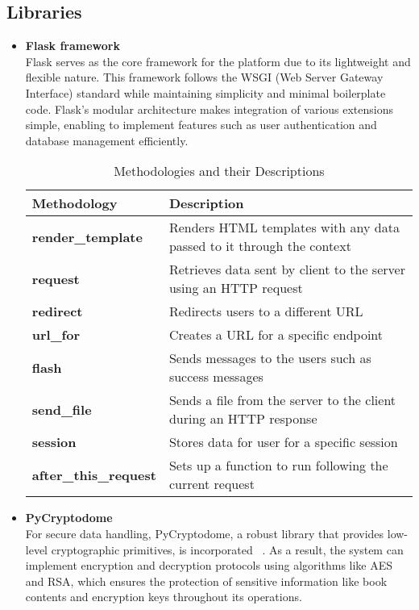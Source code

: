 \documentclass[12pt]{article}
\begin{document}
\subsection{Libraries}
\begin{itemize}
	\item \textbf{Flask framework } \\
	Flask serves as the core framework for the platform due to its lightweight and flexible nature. This framework follows the WSGI (Web Server Gateway Interface) standard while maintaining simplicity and minimal boilerplate code. Flask’s modular architecture makes integration of various extensions simple, enabling to implement features such as user authentication and database management efficiently.
	\begin{table}[htbp]
		\centering
		\begin{tabular}{|>{\bfseries}m{5cm}|m{7cm}|}  %
			\hline
			\textbf{Methodology} & \textbf{Description} \\
			\hline
			render\_template & Renders HTML templates with any data passed to it through the context \\
			\hline
			request          & Retrieves data sent by client to the server using an HTTP request \\
			\hline
			redirect         & Redirects users to a different URL \\
			\hline
			url\_for         & Creates a URL for a specific endpoint \\
			\hline
			flash            & Sends messages to the users such as success messages \\
			\hline
			send\_file       & Sends a file from the server to the client during an HTTP response \\
			\hline
			session          & Stores data for user for a specific session \\
			\hline
			after\_this\_request & Sets up a function to run following the current request \\
			\hline
		\end{tabular}
		\caption{Methodologies and their Descriptions}
		\label{tab:methodologies}
	\end{table}
\item \textbf{PyCryptodome} \\
For secure data handling, PyCryptodome, a robust library that provides low-level cryptographic primitives, is incorporated ~\cite{Asana2021}. As a result, the system can implement encryption and decryption protocols using algorithms like AES and RSA, which ensures the protection of sensitive information like book contents and encryption keys throughout its operations.

\end{itemize}
\end{document}
